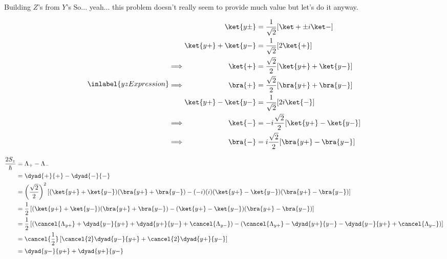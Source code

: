 \begin{answer}
  \begin{answerpart}{\texorpdfstring{Building $Z$'s from $Y$'s}{Building Z's from Y's}}
    So... yeah... this problem doesn't really seem to provide much
    value but let's do it anyway.

    \begin{equation}
      \inlabel{yzExpression}
      \begin{alignedat}{2}
        &&\ket{y\pm} &= \frac{1}{\sqrt{2}} [\ket + \pm i\ket -]\\
        &&\ket{y+} + \ket{y-} &= \frac{1}{\sqrt{2}} [2\ket{+}]\\
        \implies&&\ket{+} &= \frac{\sqrt{2}}{2}[\ket{y+} + \ket{y-}]\\
        \implies&&\bra{+} &= \frac{\sqrt{2}}{2}[\bra{y+} + \bra{y-}]\\
        &&\ket{y+} - \ket{y-} &= \frac{1}{\sqrt{2}} [2i\ket{-}]\\
        \implies&&\ket{-} &= -i\frac{\sqrt{2}}{2}[\ket{y+} - \ket{y-}]\\
        \implies&&\bra{-} &= i\frac{\sqrt{2}}{2}[\bra{y+} - \bra{y-}]\\
      \end{alignedat}
    \end{equation}

    \begin{equation}
      \begin{split}
        \frac{2S_z}{\hbar}
        &= \Lambda_+ - \Lambda_-\\
        &= \dyad{+}{+} - \dyad{-}{-}\\
        &= \left(\frac{\sqrt{2}}{2}\right)^2
        \left[
          (\ket{y+} + \ket{y-})(\bra{y+} + \bra{y-})
          -
          (-i)(i)(\ket{y+} - \ket{y-})(\bra{y+} - \bra{y-})
          \right]
        \\
        &= \frac{1}{2}
        \left[
          (\ket{y+} + \ket{y-})(\bra{y+} + \bra{y-})
          -
          (\ket{y+} - \ket{y-})(\bra{y+} - \bra{y-})
          \right]
        \\
        &= \frac{1}{2}
        \left[
          (\cancel{\Lambda_{y+}} + \dyad{y-}{y+} + \dyad{y+}{y-} + \cancel{\Lambda_{y-}})
          -
          (\cancel{\Lambda_{y+}} - \dyad{y+}{y-} - \dyad{y-}{y+} + \cancel{\Lambda_{y-}})
          \right]
        \\
        &= \cancel{\frac{1}{2}}
        \left[
          \cancel{2}\dyad{y-}{y+}
          + \cancel{2}\dyad{y+}{y-}
          \right]
        \\
        &= \dyad{y-}{y+} + \dyad{y+}{y-}
        \\
      \end{split}
    \end{equation}


\end{answerpart}
\end{answer}
